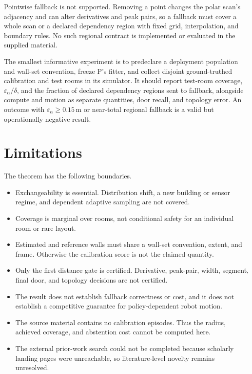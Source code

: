 \documentclass{article}
\begin{document}
Pointwise fallback is not supported. Removing a point changes the polar scan's adjacency and can alter derivatives and peak pairs, so a fallback must cover a whole scan or a declared dependency region with fixed grid, interpolation, and boundary rules. %
No such regional contract is implemented or evaluated in the supplied material. %

The smallest informative experiment is to predeclare a deployment population and wall-set convention, freeze P's fitter, and collect disjoint ground-truthed calibration and test rooms in its simulator. %
It should report test-room coverage, $\varepsilon_\alpha/\delta$, and the fraction of declared dependency regions sent to fallback, alongside compute and motion as separate quantities, door recall, and topology error. %
An outcome with $\varepsilon_\alpha\geq0.15\,\mathrm{m}$ or near-total regional fallback is a valid but operationally negative result. %

\section{Limitations}
\label{sec:limitations}

The theorem has the following boundaries.
\begin{itemize}
 \item Exchangeability is essential. Distribution shift, a new building or sensor regime, and dependent adaptive sampling are not covered. %
 \item Coverage is marginal over rooms, not conditional safety for an individual room or rare layout. %
 \item Estimated and reference walls must share a wall-set convention, extent, and frame. Otherwise the calibration score is not the claimed quantity. %
 \item Only the first distance gate is certified. Derivative, peak-pair, width, segment, final door, and topology decisions are not certified. %
 \item The result does not establish fallback correctness or cost, and it does not establish a competitive guarantee for policy-dependent robot motion. %
 \item The source material contains no calibration episodes. Thus the radius,
 achieved coverage, and abstention cost cannot be computed here. %
 \item The external prior-work search could not be completed because scholarly landing pages were unreachable, so literature-level novelty remains unresolved.
\end{itemize}
\end{document}
